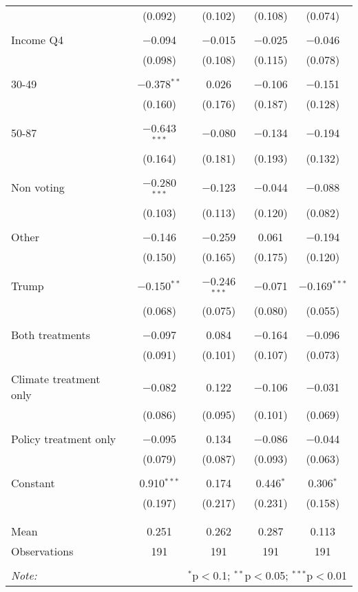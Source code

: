 \begin{tabular}{@{\extracolsep{5pt}}lcccc}
  & (0.092) & (0.102) & (0.108) & (0.074) \\ 
  & & & & \\ 
 Income Q4 & $-$0.094 & $-$0.015 & $-$0.025 & $-$0.046 \\ 
  & (0.098) & (0.108) & (0.115) & (0.078) \\ 
  & & & & \\ 
 30-49 & $-$0.378$^{**}$ & 0.026 & $-$0.106 & $-$0.151 \\ 
  & (0.160) & (0.176) & (0.187) & (0.128) \\ 
  & & & & \\ 
 50-87 & $-$0.643$^{***}$ & $-$0.080 & $-$0.134 & $-$0.194 \\ 
  & (0.164) & (0.181) & (0.193) & (0.132) \\ 
  & & & & \\ 
 Non voting & $-$0.280$^{***}$ & $-$0.123 & $-$0.044 & $-$0.088 \\ 
  & (0.103) & (0.113) & (0.120) & (0.082) \\ 
  & & & & \\ 
 Other & $-$0.146 & $-$0.259 & 0.061 & $-$0.194 \\ 
  & (0.150) & (0.165) & (0.175) & (0.120) \\ 
  & & & & \\ 
 Trump & $-$0.150$^{**}$ & $-$0.246$^{***}$ & $-$0.071 & $-$0.169$^{***}$ \\ 
  & (0.068) & (0.075) & (0.080) & (0.055) \\ 
  & & & & \\ 
 Both treatments & $-$0.097 & 0.084 & $-$0.164 & $-$0.096 \\ 
  & (0.091) & (0.101) & (0.107) & (0.073) \\ 
  & & & & \\ 
 Climate treatment only & $-$0.082 & 0.122 & $-$0.106 & $-$0.031 \\ 
  & (0.086) & (0.095) & (0.101) & (0.069) \\ 
  & & & & \\ 
 Policy treatment only & $-$0.095 & 0.134 & $-$0.086 & $-$0.044 \\ 
  & (0.079) & (0.087) & (0.093) & (0.063) \\ 
  & & & & \\ 
 Constant & 0.910$^{***}$ & 0.174 & 0.446$^{*}$ & 0.306$^{*}$ \\ 
  & (0.197) & (0.217) & (0.231) & (0.158) \\ 
  & & & & \\ 
\hline \\[-1.8ex] 
Mean & 0.251 & 0.262 & 0.287 & 0.113 \\ 
Observations & 191 & 191 & 191 & 191 \\ 
\hline 
\hline \\[-1.8ex] 
\textit{Note:}  & \multicolumn{4}{r}{$^{*}$p$<$0.1; $^{**}$p$<$0.05; $^{***}$p$<$0.01} \\ 
\end{tabular} 
